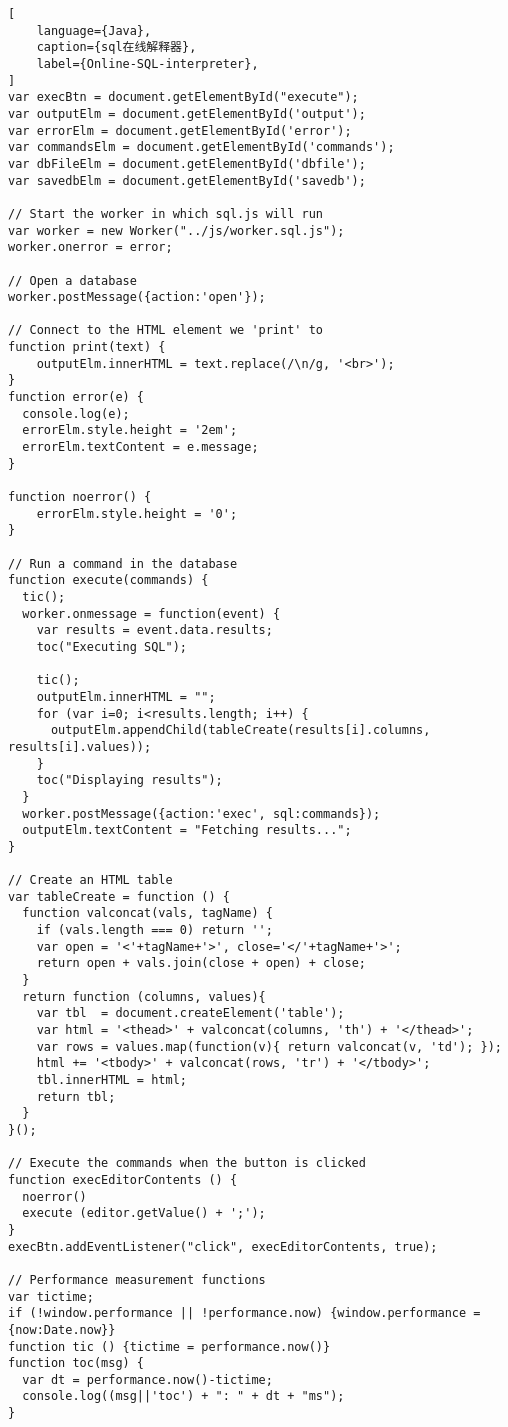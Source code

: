 \newpage

\begin{lstlisting}[
    language={Java},
    caption={sql在线解释器},
    label={Online-SQL-interpreter},
]
var execBtn = document.getElementById("execute");
var outputElm = document.getElementById('output');
var errorElm = document.getElementById('error');
var commandsElm = document.getElementById('commands');
var dbFileElm = document.getElementById('dbfile');
var savedbElm = document.getElementById('savedb');

// Start the worker in which sql.js will run
var worker = new Worker("../js/worker.sql.js");
worker.onerror = error;

// Open a database
worker.postMessage({action:'open'});

// Connect to the HTML element we 'print' to
function print(text) {
    outputElm.innerHTML = text.replace(/\n/g, '<br>');
}
function error(e) {
  console.log(e);
  errorElm.style.height = '2em';
  errorElm.textContent = e.message;
}

function noerror() {
    errorElm.style.height = '0';
}

// Run a command in the database
function execute(commands) {
  tic();
  worker.onmessage = function(event) {
    var results = event.data.results;
    toc("Executing SQL");

    tic();
    outputElm.innerHTML = "";
    for (var i=0; i<results.length; i++) {
      outputElm.appendChild(tableCreate(results[i].columns, results[i].values));
    }
    toc("Displaying results");
  }
  worker.postMessage({action:'exec', sql:commands});
  outputElm.textContent = "Fetching results...";
}

// Create an HTML table
var tableCreate = function () {
  function valconcat(vals, tagName) {
    if (vals.length === 0) return '';
    var open = '<'+tagName+'>', close='</'+tagName+'>';
    return open + vals.join(close + open) + close;
  }
  return function (columns, values){
    var tbl  = document.createElement('table');
    var html = '<thead>' + valconcat(columns, 'th') + '</thead>';
    var rows = values.map(function(v){ return valconcat(v, 'td'); });
    html += '<tbody>' + valconcat(rows, 'tr') + '</tbody>';
    tbl.innerHTML = html;
    return tbl;
  }
}();

// Execute the commands when the button is clicked
function execEditorContents () {
  noerror()
  execute (editor.getValue() + ';');
}
execBtn.addEventListener("click", execEditorContents, true);

// Performance measurement functions
var tictime;
if (!window.performance || !performance.now) {window.performance = {now:Date.now}}
function tic () {tictime = performance.now()}
function toc(msg) {
  var dt = performance.now()-tictime;
  console.log((msg||'toc') + ": " + dt + "ms");
}


\end{lstlisting}
